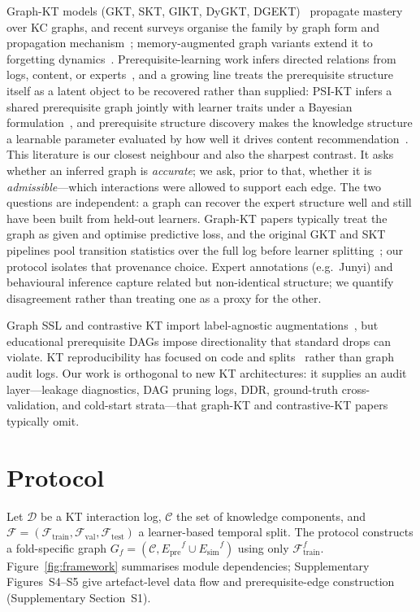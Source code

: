 \documentclass[preprint,10pt,doubleblind]{elsarticle}
\newcommand{\Epre}{\ensuremath{E_{\text{pre}}}}
\newcommand{\Esim}{\ensuremath{E_{\text{sim}}}}
\newcommand{\KCs}{knowledge components}
\newcommand{\DDR}{\textsc{DDR}}
\begin{document}
Graph-KT models (GKT, SKT, GIKT, DyGKT, DGEKT)~\cite{nakagawa2019gkt,tong2020skt,yang2021gikt,dygkt2024,dgekt2024}
propagate mastery over KC graphs, and recent surveys organise the family by
graph form and propagation
mechanism~\cite{xu2026gbktsurvey,abdelrahman2023kt_survey}; memory-augmented
graph variants extend it to forgetting dynamics~\cite{abdelrahman2023dgmn}.
Prerequisite-learning work infers directed relations from logs, content, or
experts~\cite{lin2016moocprereq,bai2025survey,chang2015junyi}, and a growing
line treats the prerequisite structure itself as a latent object to be
recovered rather than supplied: PSI-KT infers a shared prerequisite graph
jointly with learner traits under a Bayesian
formulation~\cite{zhou2024psikt}, and prerequisite structure discovery makes
the knowledge structure a learnable parameter evaluated by how well it drives
content recommendation~\cite{annabi2023prereq}.
This literature is our closest neighbour and also the sharpest contrast. It
asks whether an inferred graph is \emph{accurate}; we ask, prior to that,
whether it is \emph{admissible}---which interactions were allowed to support
each edge. The two questions are independent: a graph can recover the expert
structure well and still have been built from held-out learners. Graph-KT
papers typically treat the graph as given and optimise predictive loss, and
the original GKT and SKT pipelines pool transition statistics over the full log
before learner splitting~\cite{nakagawa2019gkt,tong2020skt}; our protocol
isolates that provenance choice. Expert annotations (e.g.\ Junyi) and
behavioural inference capture related but non-identical structure; we quantify
disagreement rather than treating one as a proxy for the other.

Graph SSL and contrastive KT import label-agnostic augmentations~\cite{you2020graphcl,lee2022cl4kt,kipf2017gcn},
but educational prerequisite DAGs impose directionality that standard drops can
violate. KT reproducibility has focused on code and splits~\cite{liu2022pykt}
rather than graph audit logs. Our work is orthogonal to new KT architectures: it
supplies an audit layer---leakage diagnostics, DAG pruning logs, \DDR{},
ground-truth cross-validation, and cold-start strata---that graph-KT and
contrastive-KT papers typically omit.
\section{Protocol}
\label{sec:protocol}
Let $\mathcal{D}$ be a KT interaction log, $\mathcal{C}$ the set of
\KCs{}, and $\mathcal{F}=(\mathcal{F}_{\text{train}},
\mathcal{F}_{\text{val}},\mathcal{F}_{\text{test}})$ a learner-based
temporal split. The protocol constructs a fold-specific graph
$G_f=(\mathcal{C},\Epre^f\cup\Esim^f)$ using only
$\mathcal{F}_{\text{train}}^f$. Figure~\ref{fig:framework} summarises module
dependencies; Supplementary Figures~S4--S5 give artefact-level data flow and
prerequisite-edge construction (Supplementary Section~S1).
\end{document}
